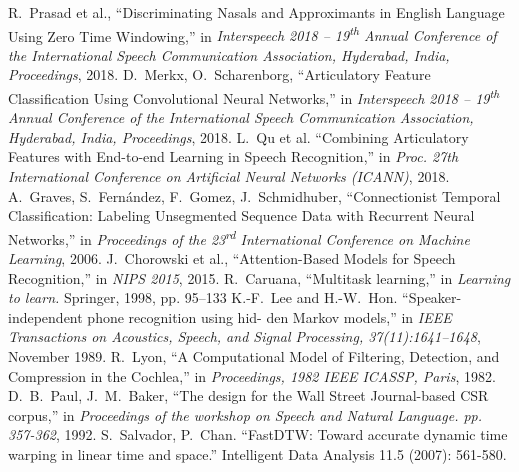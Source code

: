 \documentclass[a4paper]{article}
\begin{document}
\begin{thebibliography}{9}
   R.\ Prasad et al.,
   ``Discriminating Nasals and Approximants in English Language Using Zero Time Windowing,''
   in \textit{Interspeech 2018 -- 19\textsuperscript{th} Annual Conference of the International Speech Communication Association, Hyderabad, India, Proceedings}, 2018.
    D.\ Merkx, O.\ Scharenborg,
    ``Articulatory Feature Classification Using Convolutional Neural Networks,''
    in \textit{Interspeech 2018 -- 19\textsuperscript{th} Annual Conference of the International Speech Communication Association, Hyderabad, India, Proceedings}, 2018.
   L.\ Qu et al.
   ``Combining Articulatory Features with End-to-end Learning in Speech Recognition,''
   in \textit{Proc. 27th International Conference on Artificial Neural Networks (ICANN)}, 2018.
   A.\ Graves, S.\ Fernández, F.\ Gomez, J.\ Schmidhuber,
   ``Connectionist Temporal Classification: Labeling Unsegmented Sequence Data with Recurrent Neural Networks,''
   in \textit{Proceedings of the 23\textsuperscript{rd} International Conference on Machine Learning}, 2006.
   J.\ Chorowski et al.,
   ``Attention-Based Models for Speech Recognition,''
   in \textit{NIPS 2015}, 2015.
   R.\ Caruana,
   ``Multitask learning,''
   in \textit{Learning to learn.} Springer, 1998, pp. 95–133
   K.-F.\ Lee and H.-W.\ Hon.
   ``Speaker-independent phone recognition using hid- den Markov models,''
   in \textit{IEEE Transactions on Acoustics, Speech, and Signal Processing, 37(11):1641–1648}, November 1989.
   R.\ Lyon,
   ``A Computational Model of Filtering, Detection, and Compression in the Cochlea,''
   in \textit{Proceedings, 1982 IEEE ICASSP, Paris}, 1982.
   D.\ B.\ Paul, J.\ M.\ Baker,
   ``The design for the Wall Street Journal-based CSR corpus,''
   in \textit{Proceedings of the workshop on Speech and Natural Language. pp. 357-362}, 1992.
   S.\ Salvador, P.\ Chan. ``FastDTW: Toward accurate dynamic time warping in linear time and space.'' Intelligent Data Analysis 11.5 (2007): 561-580.
   
 \end{thebibliography}
\end{document}
